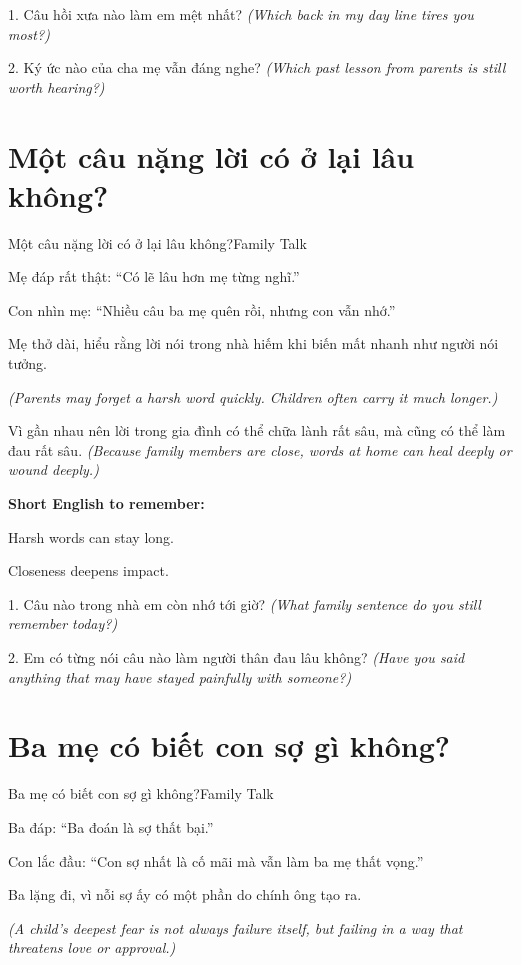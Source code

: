 \begin{tuhocnhanh}
1. Câu hồi xưa nào làm em mệt nhất? \textit{(Which back in my day line tires you most?)}

2. Ký ức nào của cha mẹ vẫn đáng nghe? \textit{(Which past lesson from parents is still worth hearing?)}
\end{tuhocnhanh}
\ngancach

\section{Một câu nặng lời có ở lại lâu không?}
\begin{truyen}{Một câu nặng lời có ở lại lâu không?}{Family Talk}

Mẹ đáp rất thật: ``Có lẽ lâu hơn mẹ từng nghĩ.''

Con nhìn mẹ: ``Nhiều câu ba mẹ quên rồi, nhưng con vẫn nhớ.''

Mẹ thở dài, hiểu rằng lời nói trong nhà hiếm khi biến mất nhanh như người nói tưởng.

\textit{(Parents may forget a harsh word quickly. Children often carry it much longer.)}
\end{truyen}

\begin{baihoc}
Vì gần nhau nên lời trong gia đình có thể chữa lành rất sâu, mà cũng có thể làm đau rất sâu.
\textit{(Because family members are close, words at home can heal deeply or wound deeply.)}
\end{baihoc}

\begin{ghinhoanh}
\textbf{Short English to remember:}

Harsh words can stay long.

Closeness deepens impact.
\end{ghinhoanh}

\begin{tuhocnhanh}
1. Câu nào trong nhà em còn nhớ tới giờ? \textit{(What family sentence do you still remember today?)}

2. Em có từng nói câu nào làm người thân đau lâu không? \textit{(Have you said anything that may have stayed painfully with someone?)}
\end{tuhocnhanh}
\ngancach

\section{Ba mẹ có biết con sợ gì không?}
\begin{truyen}{Ba mẹ có biết con sợ gì không?}{Family Talk}

Ba đáp: ``Ba đoán là sợ thất bại.''

Con lắc đầu: ``Con sợ nhất là cố mãi mà vẫn làm ba mẹ thất vọng.''

Ba lặng đi, vì nỗi sợ ấy có một phần do chính ông tạo ra.

\textit{(A child's deepest fear is not always failure itself, but failing in a way that threatens love or approval.)}
\end{truyen}

